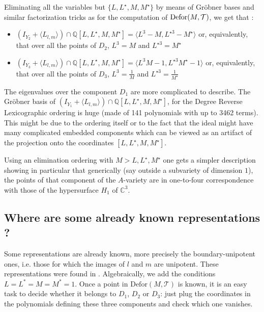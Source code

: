 Eliminating all the variables but $\{ L,L^{\star} ,M,M^{\star} \}$ by means of
Gr{\"o}bner bases and similar factorization tricks as for the computation of
$\operatorname{Defor} ( M, \mathcal{T} )$, we get that :
\begin{itemize}
  \item $( I_{Y_{2}} + \langle L_{l,m} \rangle ) \cap \mathbb{Q} [
  L,L^{\star} ,M,M^{\star} ] = \langle L^{3} -M,L^{\star 3} -M^{\star}
  \rangle$ or, equivalently, that over all the points of $D_{2}$, $L^{3} =M$
  and $L^{\star 3} =M^{\star}$
  
  \item $( I_{Y_{3}} + \langle L_{l,m} \rangle ) \cap \mathbb{Q} [
  L,L^{\star} ,M,M^{\star} ] = \langle L^{3} M-1,L^{\star 3} M^{\star} -1
  \rangle$ or, equivalently, that over all the points of $D_{3}$, $L^{3} =
  \frac{1}{M}$ and $L^{\star 3} = \frac{1}{M^{\star}}$
\end{itemize}
The eigenvalues over the component $D_{1}$ are more complicated to describe.
The Gr{\"o}bner basis of $( I_{Y_{1}} + \langle L_{l,m} \rangle ) \cap
\mathbb{Q} [ L,L^{\star} ,M,M^{\star} ]$, for the Degree Reverse
Lexicographic ordering is huge (made of 141 polynomials with up to 3462
terms). This might be due to the ordering itself or to the fact that the ideal
might have many complicated embedded components which can be viewed as an
artifact of the projection onto the coordinates $[L,L^{\star} ,M,M^{\star} ]$.

Using an elimination ordering with $M>L,L^{\star} ,M^{\star}$ one gets a
simpler description showing in particular that generically (say outside a
subvariety of dimension $1$), the points of that component of the $A$-variety
are in one-to-four correspondence with those of the hypersurface $H_{1}$ of
$\mathbb{C}^{3}$.

\subsection{Where are some already known representations ?}

\label{section:example-unipotent}Some representations are already known, more
precisely the boundary-unipotent ones, i.e. those for which the images of $l$
and $m$ are unipotent. These representations were found in {\cite{FKR14}}.
Algebraically, we add the conditions $L=L^{\ast} =M=M^{\ast} =1$. Once a point in $\mathrm{Defor}(M,\mathcal T)$ is known, it is an easy task to decide whether it belongs to $D_1$, $D_2$ or $D_3$: just plug the coordinates in the polynomials defining these three components and check which one vanishes.

